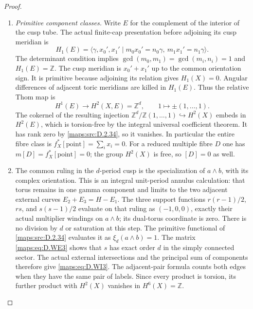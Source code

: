 \begin{proof}
\begin{enumerate}[label=\arabic*.,leftmargin=*]
\item \emph{Primitive component classes.}
Write $E$ for the complement of the interior of the cusp tube.
The actual finite-cap presentation before adjoining its cusp meridian is
\[
 H_1(E)=
 \langle\gamma,x_0',x_1'\mid m_0x_0'=n_0\gamma,\ 
                                   m_1x_1'=n_1\gamma\rangle .
\]
The determinant condition implies
$\gcd(m_0,m_1)=\gcd(m_i,n_i)=1$ and $H_1(E)=\mathbb Z$.
The cusp meridian is $x_0'+x_1'$ up to the common orientation sign.
It is primitive because adjoining its relation gives $H_1(X)=0$.
Angular differences of adjacent toric meridians are killed in
$H_1(E)$.  Thus the relative Thom map is
\[
 H^1(E)\longrightarrow H^2(X,E)=\mathbb Z^d,\qquad
                   1\longmapsto\pm(1,\ldots,1).
 \tag{D.WI4}\label{maps:eq:D.WI4}
\]
The cokernel of the resulting injection
$\mathbb Z^d/\mathbb Z(1,\ldots,1)\hookrightarrow H^2(X)$
embeds in $H^2(E)$, which is torsion-free by the integral universal
coefficient theorem.  It has rank zero by \ref{maps:src:D.2.34}, so it vanishes.
In particular the entire fibre class is
$f_X^*[\mathrm{point}]=\sum_i x_i=0$.
For a reduced multiple fibre $D$ one has
$m[D]=f_X^*[\mathrm{point}]=0$; the group $H^2(X)$ is free,
so $[D]=0$ as well.

\item The common ruling in the $d$-period cusp is the specialization
of $a\wedge b$, with its complex orientation.  This is an integral
unit-period annulus calculation: that torus remains in one gamma
component and limits to the two adjacent external curves
$E_2+E_3=H-E_1$.  The three support functions
$r(r-1)/2$, $rs$, and $s(s-1)/2$ evaluate on that ruling as
$(-1,0,0)$, exactly their actual multiplier windings on
$a\wedge b$; its dual-torus coordinate is zero.
There is no division by $d$ or saturation at this step.
The primitive functional of \ref{maps:src:D.2.34} evaluates it as
$\xi_d(a\wedge b)=1$.  The matrix \eqref{maps:eq:D.WE3} shows that $s$ has
exact order $d$ in the simply connected sector.  The actual
external intersections and the principal sum of components
therefore give \eqref{maps:eq:D.WI3}.  The adjacent-pair formula counts both
edges when they have the same pair of labels.  Since every
product is torsion, its further product with $H^2(X)$ vanishes
in $H^6(X)=\mathbb Z$.


\end{enumerate}
\end{proof}
